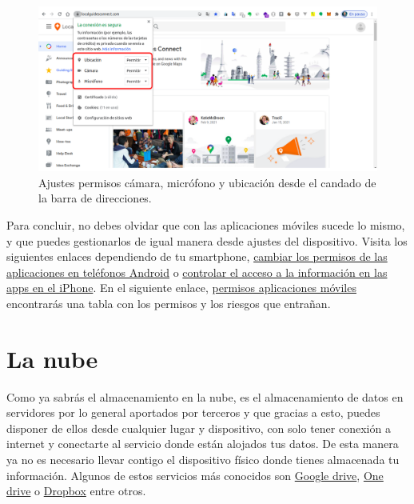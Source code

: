 \documentclass[
  spanish,
  a4paper,
  openany]{book}
\begin{document}
\begin{figure}

{\centering \includegraphics[width=0.75\linewidth]{images/ajuste-permisos-desde-navegador} 

}

\caption{Ajustes permisos cámara, micrófono y ubicación desde el candado de la barra de direcciones.}\label{fig:unnamed-chunk-8}
\end{figure}

Para concluir, no debes olvidar que con las aplicaciones móviles sucede lo mismo, y que puedes gestionarlos de igual manera desde ajustes del dispositivo. Visita los siguientes enlaces dependiendo de tu smartphone, \href{https://support.google.com/android/answer/9431959?hl=es}{cambiar los permisos de las aplicaciones en teléfonos Android} o \href{https://support.apple.com/es-es/guide/iphone/iph251e92810/ios}{controlar el acceso a la información en las apps en el iPhone}. En el siguiente enlace, \href{https://www.osi.es/sites/default/files/docs/c5-eg-permisos-apps-riesgos.pdf}{permisos aplicaciones móviles} encontrarás una tabla con los permisos y los riesgos que entrañan.

\hypertarget{la-nube}{%
\section{La nube}\label{la-nube}}

Como ya sabrás el almacenamiento en la nube, es el almacenamiento de datos en servidores por lo general aportados por terceros y que gracias a esto, puedes disponer de ellos desde cualquier lugar y dispositivo, con solo tener conexión a internet y conectarte al servicio donde están alojados tus datos. De esta manera ya no es necesario llevar contigo el dispositivo físico donde tienes almacenada tu información. Algunos de estos servicios más conocidos son \href{https://www.google.com/intl/en_in/drive/}{Google drive}, \href{https://www.microsoft.com/en-us/microsoft-365/onedrive/online-cloud-storage}{One drive} o \href{https://www.dropbox.com/}{Dropbox} entre otros.
\end{document}
